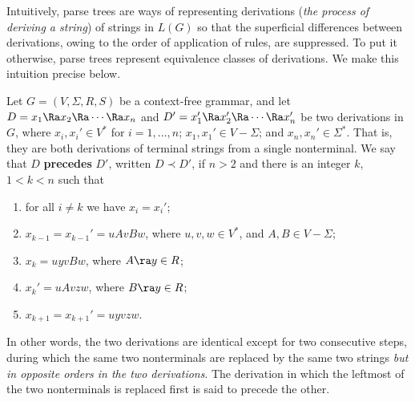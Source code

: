 \begin{multicols}{2}
Intuitively, parse trees are ways of representing derivations (\textit{the process of deriving a string}) of strings in $L(G)$ so that the superficial differences between derivations, owing to the order of application of rules, are suppressed. To put it otherwise, parse trees represent
equivalence classes of derivations. We make this intuition precise below. 

Let $G = (V, \Sigma, R, S)$ be a context-free grammar, and let $D = x_1 \Ra x_2 \Ra \cdots \Ra x_n$ and $D' = x_1' \Ra x_2' \Ra \cdots \Ra x_n'$ be two derivations in $G$, where $x_i, x_i' \in V^*$ for $i = 1, \ldots, n$; $x_1, x_1' \in V - \Sigma$; and $x_n, x_n' \in \Sigma^*$. That is, they are both derivations of terminal strings from a single nonterminal. We say that $D$ \textbf{precedes} $D'$, written $D \prec D'$, if $n > 2$ and there is an integer $k$, $1 < k < n$ such that

\begin{enumerate}
    \item for all $i \neq k$ we have $x_i = x_i'$;
    \item $x_{k-1} = x_{k-1}' = uAvBw$, where $u, v, w \in V^*$, and $A, B \in V - \Sigma$;
    \item $x_k = uyvBw$, where $A \ra y \in R$;
    \item $x_k' = uAvzw$, where $B \ra y \in R$;
    \item $x_{k+1} = x_{k+1}' = uyvzw$.
\end{enumerate}

In other words, the two derivations are identical except for two consecutive steps, during which the same two nonterminals are replaced by the same two strings \textit{but in opposite orders in the two derivations}. The derivation in which the leftmost of the two nonterminals is replaced first is said to precede the other.

\end{multicols}


